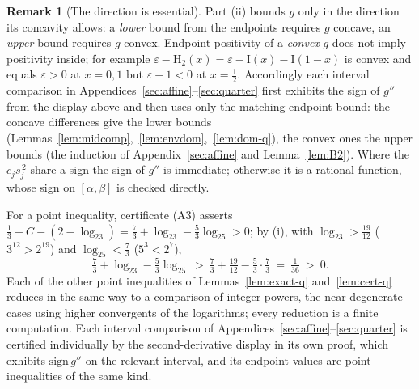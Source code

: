 \documentclass[journal]{IEEEtran}
\theoremstyle{definition}
\newtheorem{remark}{Remark}
\newcommand{\Hh}{\mathrm H_2}
\newcommand{\lgg}{\log_2}
\newcommand{\CC}{C}
\begin{document}
\begin{remark}[The direction is essential]
Part \textup{(ii)} bounds $g$ only in the direction its concavity allows: a
\emph{lower} bound from the endpoints requires $g$ concave, an \emph{upper} bound
requires $g$ convex. Endpoint positivity of a \emph{convex} $g$ does not imply
positivity inside; for example $\varepsilon-\Hh(x)=\varepsilon-\mathrm I(x)
-\mathrm I(1-x)$ is convex and equals $\varepsilon>0$ at $x=0,1$ but
$\varepsilon-1<0$ at $x=\tfrac12$. Accordingly each interval comparison in
Appendices~\ref{sec:affine}--\ref{sec:quarter} first exhibits the sign of $g''$
from the display above and then uses only the matching endpoint bound: the
concave differences give the lower bounds
(Lemmas~\ref{lem:midcomp},~\ref{lem:envdom},~\ref{lem:dom-q}), the convex ones
the upper bounds (the induction of Appendix~\ref{sec:affine} and
Lemma~\ref{lem:B2}). Where the $c_j s_j^{\,2}$ share a sign the sign of $g''$ is
immediate; otherwise it is a rational function, whose sign on $[\alpha,\beta]$ is
checked directly.
\end{remark}

For a point inequality, certificate \textup{(A3)} asserts
$\tfrac13+\CC-(2-\lgg3)=\tfrac73+\lgg3-\tfrac53\lgg5>0$; by \textup{(i)}, with
$\lgg3>\tfrac{19}{12}$ \textup{(}$3^{12}>2^{19}$\textup{)} and
$\lgg5<\tfrac73$ \textup{(}$5^{3}<2^{7}$\textup{)},
\[
  \tfrac73+\lgg3-\tfrac53\lgg5\ >\ \tfrac73+\tfrac{19}{12}-\tfrac53\cdot\tfrac73
  \ =\ \tfrac1{36}\ >\ 0 .
\]
Each of the other point inequalities of Lemmas~\ref{lem:exact-q}
and~\ref{lem:cert-q} reduces in the same way to a comparison of integer powers,
the near-degenerate cases using higher convergents of the logarithms; every
reduction is a finite computation. Each interval comparison of
Appendices~\ref{sec:affine}--\ref{sec:quarter} is certified individually by the
second-derivative display in its own proof, which exhibits $\mathrm{sign}\,g''$
on the relevant interval, and its endpoint values are point inequalities of the
same kind.
\end{document}

